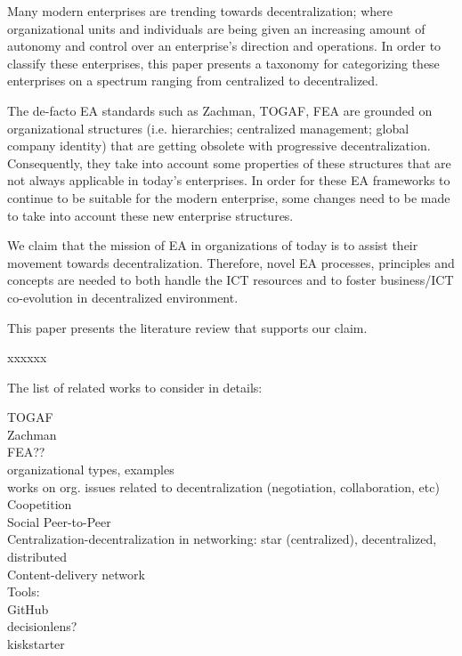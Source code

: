 Many modern enterprises are trending towards decentralization; where organizational units and individuals are being given an increasing amount of autonomy and control over an enterprise's direction and operations. In order to classify these enterprises, this paper presents a taxonomy for categorizing these enterprises on a spectrum ranging from centralized to decentralized. 

The de-facto EA standards such as Zachman, TOGAF, FEA are grounded on organizational structures (i.e. hierarchies; centralized management; global company identity) that are getting obsolete with progressive decentralization. Consequently, they take into account some properties of these structures that are not always applicable in today's enterprises. In order for these EA frameworks to continue to be suitable for the modern enterprise, some changes need to be made to take into account these new enterprise structures. 

We claim that the mission of EA in organizations of today is to assist their movement towards decentralization. Therefore, novel EA processes, principles and concepts are needed to both handle the ICT resources and to foster business/ICT co-evolution in decentralized environment.

This paper presents the literature review that supports our claim. 

xxxxxx


The list of related works to consider in details:

TOGAF \\
Zachman \\
FEA?? \\
organizational types, examples  \\
works on org. issues related to decentralization (negotiation, collaboration, etc) \\
Coopetition\\
Social Peer-to-Peer \\
Centralization-decentralization in networking: star (centralized), decentralized, distributed \\
Content-delivery network \\
Tools: \\
GitHub \\
decisionlens?\\
kiskstarter\\

% 
% 
% 
% 
% 
% 
% 
% 
% 
% 
% 
% 
% 
% 
% 
% 
% 